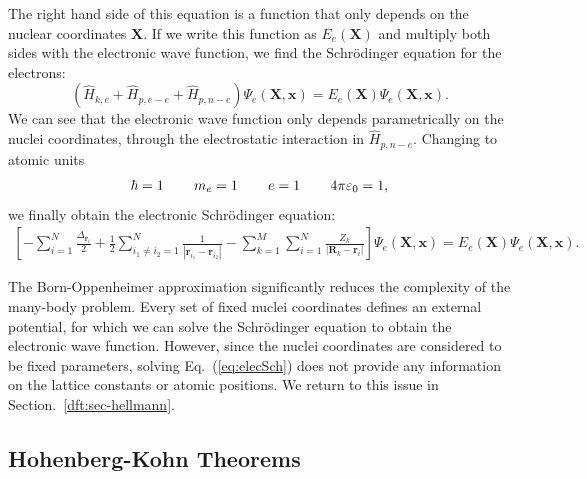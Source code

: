 \begin{refsection}
The right hand side of this equation is a function that only depends on the nuclear coordinates $\mathbf{X}$. If we write this function as $E_e(\mathbf{X})$ and multiply both sides with the electronic wave function, we find the Schr\"odinger equation for the electrons:
\begin{equation}
(\hat{H}_{k,e} + \hat{H}_{p,e-e} + \hat{H}_{p,n-e})\Psi_e(\mathbf{X}, \mathbf{x}) = E_e(\mathbf{X}) \Psi_e(\mathbf{X}, \mathbf{x}).
\end{equation}
We can see that the electronic wave function only depends parametrically on the nuclei coordinates, through the electrostatic interaction in $\hat{H}_{p,n-e}$. Changing to atomic units
\begin{equation}\label{eq:atomic}
\hbar = 1 \hspace{0.3in} m_e = 1\hspace{0.3in} e  = 1 \hspace{0.3in} 4 \pi \varepsilon_0 = 1,
\end{equation} 
we finally obtain the electronic Schr\"odinger equation:
\begin{equation}\label{eq:elecSch}
\begin{gathered}
\left[ -\sum_{i=1}^N \frac{\Delta_{\mathbf{r}_i} }{2} + \frac{1}{2} \sum_{i_1 \neq i_2 = 1}^N \frac{1}{|\mathbf{r}_{i_1}-\mathbf{r}_{i_2}|} - \sum_{k=1}^M \sum_{i=1}^N \frac{Z_k}{|\mathbf{R}_{k}-\mathbf{r}_{i}|} \right] \Psi_e(\mathbf{X}, \mathbf{x}) = E_e(\mathbf{X}) \Psi_e(\mathbf{X}, \mathbf{x}).
\end{gathered}
\end{equation}

The Born-Oppenheimer approximation significantly reduces the complexity of the many-body problem. Every set of fixed nuclei coordinates defines an external potential, for which we can solve the Schr\"odinger equation to obtain the electronic wave function. However, since the nuclei coordinates are considered to be fixed parameters, solving Eq.~(\ref{eq:elecSch}) does not provide any information on the lattice constants or atomic positions. We return to this issue in Section.~\ref{dft:sec-hellmann}.

\subsection{Hohenberg-Kohn Theorems}\label{dft:sec-HKtheorems}


\end{refsection}
